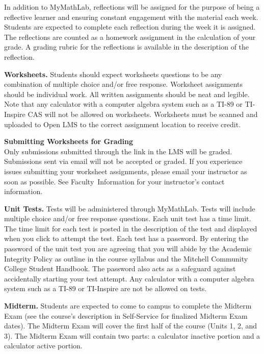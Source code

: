 \documentclass{article}
\renewenvironment{framed}[1][]{%
  \def\FrameCommand{%
    \hspace{1pt}%
    {\color{mybordercolor}\vrule width 2pt} %
    \hspace{1pt}%
    \fboxsep=\FrameSep%
    \colorbox{mybgcolor}%
  }%
  \MakeFramed {\advance\hsize-\width \FrameRestore}%
}{%
  \endMakeFramed
}
\begin{document}
In addition to MyMathLab, reflections will be assigned for the purpose of being a reflective learner and ensuring constant engagement with the material each week. Students are expected to complete each reflection during the week it is assigned. The reflections are counted as a homework assignment in the calculation of your grade. A grading rubric for the reflections is available in the description of the reflection.

\textbf{Worksheets.} Students should expect worksheets questions to be any combination of multiple choice and/or free response. Worksheet assignments should be individual work. All written assignments should be neat and legible. Note that any calculator with a computer algebra system such as a TI-89 or TI-Inspire CAS will not be allowed on worksheets. Worksheets must be scanned and uploaded to Open LMS to the correct assignment location to receive credit.

\begin{framed}
\textbf{Submitting Worksheets for Grading}\\
Only submissions submitted through the link in the LMS will be graded. Submissions sent via email will not be accepted or graded. If you experience issues submitting your worksheet assignments, please email your instructor as soon as possible. See Faculty~Information for your instructor's contact information.
\end{framed}

\textbf{Unit Tests.} Tests will be administered through MyMathLab. Tests will include multiple choice and/or free response questions. Each unit test has a time limit. The time limit for each test is posted in the description of the test and displayed when you click to attempt the test. Each test has a password. By entering the password of the unit test you are agreeing that you will abide by the Academic Integrity Policy as outline in the course syllabus and the Mitchell Community College Student Handbook. The password also acts as a safeguard against accidentally starting your test attempt. Any calculator with a computer algebra system such as a TI-89 or TI-Inspire are not be allowed on tests.

\textbf{Midterm.} Students are expected to come to campus to complete the Midterm Exam (see the course's description in Self-Service for finalized Midterm Exam dates). The Midterm Exam will cover the first half of the course (Units 1, 2, and 3). The Midterm Exam will contain two parts: a calculator inactive portion and a calculator active portion.
\end{document}
